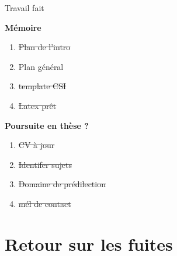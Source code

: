 \documentclass[A4,svgnames,9pt,aspectratio=169]{beamer}
\begin{document}
\begin{frame}{Travail fait}
\begin{center}
    \begin{minipage}[t]{0.45\textwidth}
      \textbf{Mémoire}
      \begin{enumerate}
        \item[{\makebox[0pt][l]{$\square$}\raisebox{.15ex}{\hspace{0.1em}$\checkmark$}}] \sout{Plan de l'intro}
        \item Plan général
        \item[{\makebox[0pt][l]{$\square$}\raisebox{.15ex}{\hspace{0.1em}$\checkmark$}}] \sout{template CSI}
        \item[{\makebox[0pt][l]{$\square$}\raisebox{.15ex}{\hspace{0.1em}$\checkmark$}}] \sout{Latex prêt}
      \end{enumerate}
    \end{minipage}
    \hfill 
    \begin{minipage}[t]{0.45\textwidth}
      \textbf{Poursuite en thèse ?}
      \begin{enumerate}
        \item[{\makebox[0pt][l]{$\square$}\raisebox{.15ex}{\hspace{0.1em}$\checkmark$}}] \sout{CV à jour}
        \item[{\makebox[0pt][l]{$\square$}\raisebox{.15ex}{\hspace{0.1em}$\checkmark$}}] \sout{Identifer sujets}
        \item[{\makebox[0pt][l]{$\square$}\raisebox{.15ex}{\hspace{0.1em}$\checkmark$}}] \sout{Domaine de prédilection}
        \item[{\makebox[0pt][l]{$\square$}\raisebox{.15ex}{\hspace{0.1em}$\checkmark$}}] \sout{mél de contact}
      \end{enumerate}
    \end{minipage}
    \end{center}

\end{frame}


\section{Retour sur les fuites}
\frame{\sectionpage}
\end{document}
